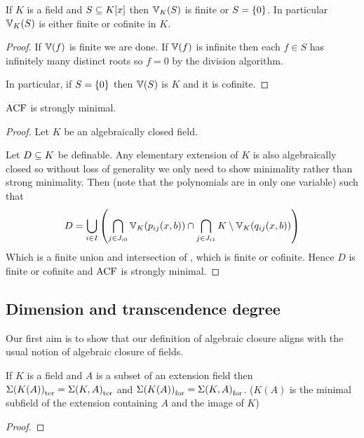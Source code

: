 \begin{lem}
    If $K$ is a field and $S \subseteq K[x]$
    then $\mathbb{V}_K(S)$ is finite or $S = \left\{0\right\}$.
    In particular $\mathbb{V}_K(S)$ is either finite or cofinite in $K$.
\end{lem}
\begin{proof}
    If $\mathbb{V}(f)$ is finite we are done.
    If $\mathbb{V}(f)$ is infinite
    then each $f \in S$ has infinitely many distinct roots
    so $f = 0$ by the division algorithm.
    
    In particular, if $S = \left\{0\right\}$ then $\mathbb{V}(S)$ is $K$ and it is cofinite.
\end{proof}

\begin{prop}
    $\operatorname{ACF}$ is strongly minimal.
\end{prop}
\begin{proof}
    Let $K$ be an algebraically closed field.
    
    Let $D \subseteq K$ be definable.
    Any elementary extension of $K$ is also algebraically closed so 
    without loss of generality we only need to show minimality rather than 
    strong minimality.
    Then  
    (note that the polynomials are in only one variable) such that 
        \[D = \bigcup_{i \in I}
        \left(\bigcap_{j \in J_{i0}} \mathbb{V}_K(p_{ij}(x,b)) \cap 
        \bigcap_{j \in J_{i1}} K \setminus \mathbb{V}_K(q_{ij}(x,b))\right)\]
    Which is a finite union and intersection of 
    ,
    which is finite or cofinite.
    Hence $D$ is finite or cofinite and $\operatorname{ACF}$ is strongly minimal.
\end{proof}

\subsection{Dimension and transcendence degree}

Our first aim is to show that our definition of algebraic closure 
aligns with the usual notion of algebraic closure of fields.
\begin{lem}
    If $K$ is a field and $A$ is a subset of an extension field then
    ${\Sigma(K(A))}_\mathrm{ter} = {\Sigma(K,A)}_\mathrm{ter}$ and
    ${\Sigma(K(A))}_\mathrm{for} = {\Sigma(K,A)}_\mathrm{for}$.
    ($K(A)$ is the minimal subfield of the extension containing 
    $A$ and the image of $K$)
\end{lem}
\begin{proof}
\end{proof}

